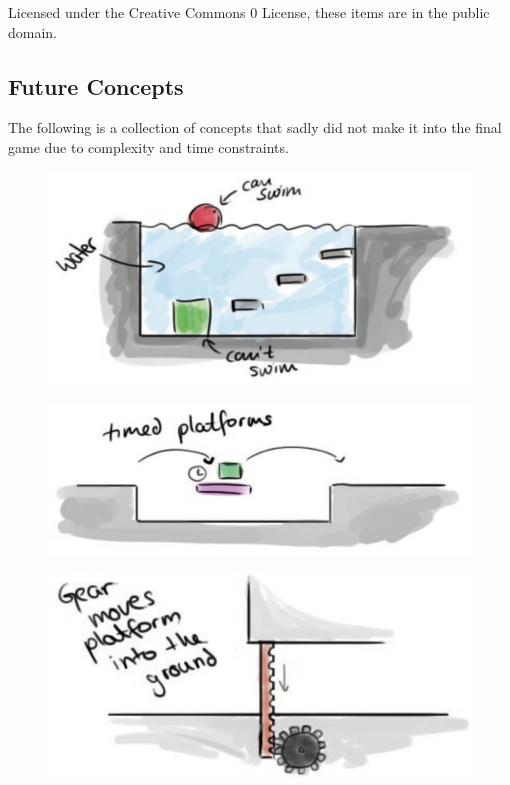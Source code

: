 \documentclass[12pt,a4paper]{scrartcl}
\begin{document}
Licensed under the Creative Commons 0 License, these items are in the public domain.

\subsection*{Future Concepts}

The following is a collection of concepts that sadly did not make it into the final game due to complexity and time constraints.  

\begin{figure}[!h]
    \includegraphics[width=\textwidth]{water.pdf}
\end{figure}

\begin{figure}[!h]
    \includegraphics[width=\textwidth]{timed.pdf}
\end{figure}

\begin{figure}[!h]
    \includegraphics[width=\textwidth]{gear.pdf}
\end{figure}
\end{document}
